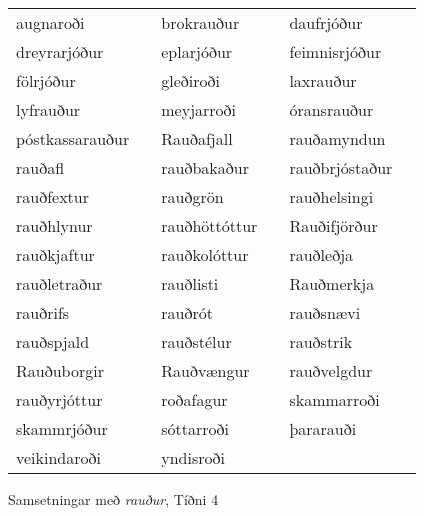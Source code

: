 \documentclass[../samsetningasafn.tex]{subfiles}
\begin{document}
\begin{wordlist}[H]
\begin{tcolorbox}

	\setlength{\extrarowheight}{3pt}
	\begin{tabular}{BlBlBl}
		augnaroði 		&	\phantom{baa}	& 	
		brokrauður		& 	\phantom{baa}	& 	
		daufrjóður		& 	\phantom{baa}	\\ 
		dreyrarjóður		&		& 	
		eplarjóður		& 		& 
		feimnisrjóður		&		\\ 
		fölrjóður			&		& 	
		gleðiroði			& 		& 	
		laxrauður		& 		\\ 	
		lyfrauður		& 		& 	
		meyjarroði		& 		& 	
		óransrauður		& 		\\ 
		póstkassarauður	&		& 	
		Rauðafjall		&		& 	
		rauðamyndun	&		\\ 
		rauðafl			&		& 	
		rauðbakaður		&		& 
		rauðbrjóstaður	&		\\ 
		rauðfextur		& 		& 
		rauðgrön		& 		& 
		rauðhelsingi		&		\\ 
		rauðhlynur		& 		& 	
		rauðhöttóttur		&		& 
		Rauðifjörður		&		\\ 
		rauðkjaftur		&		& 
		rauðkolóttur		&		& 
		rauðleðja		&		\\ 
		rauðletraður		&		& 
		rauðlisti			&		& 	
		Rauðmerkja		&		\\ 
		rauðrifs			&		& 	
		rauðrót			&		& 	
		rauðsnævi		& 		\\ 	
		rauðspjald		& 		& 	
		rauðstélur		&		& 
		rauðstrik			&		\\ 	
		Rauðuborgir		&		& 
		Rauðvængur		&		& 
		rauðvelgdur		&		\\ 
		rauðyrjóttur		&		& 
		roðafagur		&		& 	
		skammarroði		&		\\ 	
		skammrjóður		&		& 
		sóttarroði		&		& 
		þararauði		&		\\ 	
		veikindaroði		&		& 
		yndisroði		&		& 	
						&
	\end{tabular}

\end{tcolorbox}
	\caption{Samsetningar með \textit{rauður}, Tíðni 4}
	\label{listi:rautt.4}
\end{wordlist}					
\end{document}
